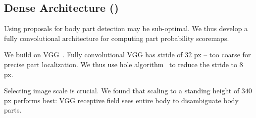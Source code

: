 
\subsection{Dense Architecture (\dense)}
\label{sec:Dense-unary}
Using proposals for body part detection may be sub-optimal.
We thus develop a fully convolutional architecture for computing part
probability scoremaps.

 We build on VGG~\cite{Simonyan14c}. Fully
convolutional VGG has stride of 32 px -- too coarse for precise part
localization. We thus use hole algorithm~\cite{chen14semantic} to
reduce the stride to 8 px.

 Selecting image scale is crucial. We
 found that scaling to a standing height of $340$ px performs
 best: %
 VGG receptive field sees entire
 body to disambiguate body parts.

